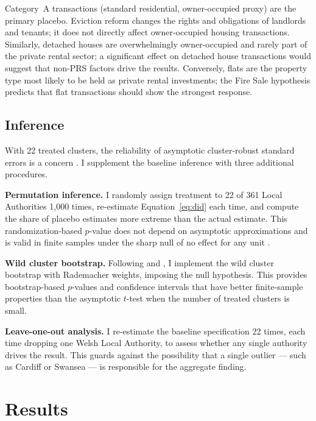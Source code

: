 \documentclass[12pt]{article}
\begin{document}
Category~A transactions (standard residential, owner-occupied proxy) are the primary placebo. Eviction reform changes the rights and obligations of landlords and tenants; it does not directly affect owner-occupied housing transactions. Similarly, detached houses are overwhelmingly owner-occupied and rarely part of the private rental sector; a significant effect on detached house transactions would suggest that non-PRS factors drive the results. Conversely, flats are the property type most likely to be held as private rental investments; the Fire Sale hypothesis predicts that flat transactions should show the strongest response.

\subsection{Inference}

With 22 treated clusters, the reliability of asymptotic cluster-robust standard errors is a concern \citep{cameron2008bootstrap}. I supplement the baseline inference with three additional procedures.

\textbf{Permutation inference.} I randomly assign treatment to 22 of 361 Local Authorities 1,000 times, re-estimate Equation~\ref{eq:did} each time, and compute the share of placebo estimates more extreme than the actual estimate. This randomization-based $p$-value does not depend on asymptotic approximations and is valid in finite samples under the sharp null of no effect for any unit \citep{fisher1935design, conley2011inference}.

\textbf{Wild cluster bootstrap.} Following \citet{cameron2008bootstrap} and \citet{mackinnon2022cluster}, I implement the wild cluster bootstrap with Rademacher weights, imposing the null hypothesis. This provides bootstrap-based $p$-values and confidence intervals that have better finite-sample properties than the asymptotic $t$-test when the number of treated clusters is small.

\textbf{Leave-one-out analysis.} I re-estimate the baseline specification 22 times, each time dropping one Welsh Local Authority, to assess whether any single authority drives the result. This guards against the possibility that a single outlier --- such as Cardiff or Swansea --- is responsible for the aggregate finding.


\section{Results}
\label{sec:results}
\end{document}
